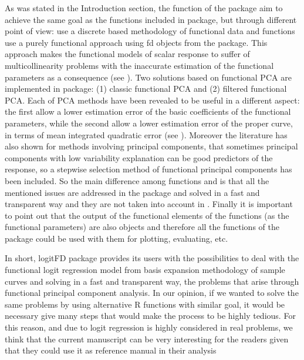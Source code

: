 As was stated in the Introduction section, the  function of the  package aim to achieve the same goal as the functions included in  package, but through different point of view:  use a discrete based methodology of functional data and  functions use a purely functional approach using fd objects from the  package. This approach makes the functional models of scalar response to suffer of multicollinearity problems with the inaccurate estimation of the functional parameters as a consequence (see \citealp{Escabias04}). Two solutions based on functional PCA are implemented in  package: (1) classic functional PCA and (2) filtered functional PCA. Each of PCA methods have been revealed to be useful in a different aspect: the first allow a lower estimation error of the basic coefficients of the functional parameters, while the second allow a lower estimation error of the proper curve, in terms of mean integrated quadratic error (see \citealp{Escabias04}). Moreover the literature has also shown for methods involving principal components, that sometimes principal components with low variability explanation can be good predictors of the response, so a stepwise selection method of functional principal components has been included. So the main difference among  functions and  is that all the mentioned issues are addressed in the  package and solved in a fast and transparent way and they are not taken into account in . Finally it is important to point out that the output of the functional elements of the  functions (as the functional parameters) are also  objects and therefore all the functions of the  package could be used with them for plotting, evaluating, etc.

In short, logitFD package provides its users with the possibilities to deal with the functional logit regression model from basis expansion methodology of sample curves and solving in a fast and transparent way, the problems that arise through functional principal component analysis. In our opinion, if we wanted to solve the same problems by using alternative R functions with similar goal, it would be necessary give many steps that would make the process to be highly tedious. For this reason, and due to logit regression is highly considered in real problems, we think that the current manuscript can be very interesting for the readers given that they could use it as reference manual in their analysis

